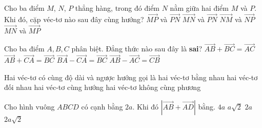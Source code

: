 \begin{ex}%
	Cho ba điểm $M$, $N$, $P$ thẳng hàng, trong đó điểm $N$ nằm giữa hai điểm $M$ và $P$. Khi đó, cặp véc-tơ nào sau đây cùng hướng?
	\choice
	{$\overrightarrow{MP}$ và $\overrightarrow{PN}$}
	{$\overrightarrow{MN}$ và $\overrightarrow{PN}$}
	{$\overrightarrow{NM}$ và $\overrightarrow{NP}$}
	{\True $\overrightarrow{MN}$ và $\overrightarrow{MP}$}
\end{ex}
\begin{ex}%
	Cho ba điểm $A,B,C$ phân biệt. Đẳng thức nào sau đây là \textbf{sai}?
	\choice
	{$\overrightarrow{AB}+\overrightarrow{BC}=\overrightarrow{AC}$}
	{\True$\overrightarrow{AB}+\overrightarrow{CA}=\overrightarrow{BC}$}
	{$\overrightarrow{BA}-\overrightarrow{CA}=\overrightarrow{BC}$}
	{$\overrightarrow{AB}-\overrightarrow{AC}=\overrightarrow{CB}$}
\end{ex}
\begin{ex}%
Hai véc-tơ có cùng độ dài và ngược hướng gọi là
\choice
{hai véc-tơ bằng nhau}
{\True hai véc-tơ đối nhau}
{hai véc-tơ cùng hướng}
{hai véc-tơ không cùng phương}
\end{ex}
\begin{ex}%
	Cho hình vuông $ABCD$ có cạnh bằng $2a$. Khi đó $\left|\overrightarrow{AB}+\overrightarrow{AD}\right|$ bằng.
	\choice
		{$4a$}
		{$a\sqrt{2}$}
		{$2a$}
		{\True $2a\sqrt{2}$}
\end{ex}
